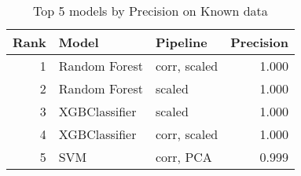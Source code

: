 \begin{table}[!htb]
\centering
\begin{tabular}{rllr}
\toprule
Rank & Model & Pipeline & Precision \\
\midrule
1 & Random Forest & corr, scaled & 1.000 \\
2 & Random Forest & scaled & 1.000 \\
3 & XGBClassifier & scaled & 1.000 \\
4 & XGBClassifier & corr, scaled & 1.000 \\
5 & SVM & corr, PCA & 0.999 \\
\bottomrule
\end{tabular}
\caption{Top 5 models by Precision on Known data}
\label{table-top-5-precision-known}
\end{table}

